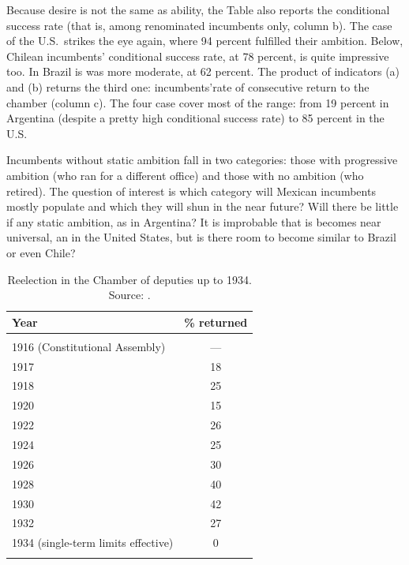 \documentclass[letter,12pt]{article}
\begin{document}
Because desire is not the same as ability, the Table also reports the conditional success rate (that is, among renominated incumbents only, column b). The case of the U.S.\ strikes the eye again, where 94 percent fulfilled their ambition. Below, Chilean incumbents' conditional success rate, at 78 percent, is quite impressive too. In Brazil is was more moderate, at 62 percent. The product of indicators (a) and (b) returns the third one: incumbents'rate of consecutive return to the chamber (column c). The four case cover most of the range: from 19 percent in Argentina (despite a pretty high conditional success rate) to 85 percent in the U.S.

Incumbents without static ambition fall in two categories: those with progressive ambition (who ran for a different office) and those with no ambition (who retired). The question of interest is which category will Mexican incumbents mostly populate and which they will shun in the near future? Will there be little if any static ambition, as in Argentina? It is improbable that is becomes near universal, an in the United States, but is there room to become similar to Brazil or even Chile?

\begin{table}
  \centering
  \begin{tabular}{lc}
    Year &  \% returned  \\ \hline \\ [-1.25ex]
    1916 (Constitutional Assembly) &          --- \\
    1917 &           18 \\
    1918 &           25 \\
    1920 &           15 \\
    1922 &           26 \\
    1924 &           25 \\
    1926 &           30 \\
    1928 &           40 \\
    1930 &           42 \\
    1932 &           27 \\
    1934 (single-term limits effective) &            0 \\ [-1.25ex] \\ \hline
  \end{tabular}
  \caption{Reelection in the Chamber of deputies up to 1934. Source: \citet{godoy.reeleccion.2014}.}\label{T:1920s}
\end{table}
\end{document}
